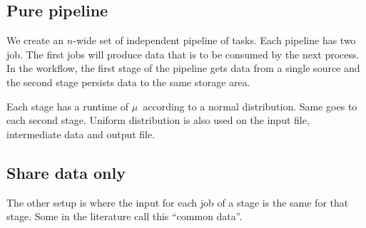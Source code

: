 \documentclass{article}
\begin{document}
\subsection{Pure pipeline} %
\label{sub:pure_pipeline}


We create an $n$-wide set of independent pipeline of tasks.  Each pipeline has
two job.  The first jobs will produce data that is to be consumed by the next
process.  In the workflow, the first stage of the pipeline gets data from a
single source and the second stage persists data to the same storage area.

Each stage has a runtime of $\mu$~\second according to a normal distribution.
Same goes to each second stage.  Uniform distribution is also used on the input
file, intermediate data and output file.

\subsection{Share data only} %
\label{sub:shared_data_only}

The other setup is where the input for each job of a stage is the same for that
stage.  Some in the literature call this ``common data''.


\end{document}
